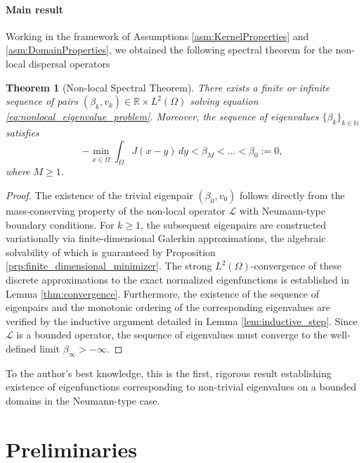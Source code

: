 \documentclass[11pt, a4paper]{article}
\theoremstyle{break}
\newtheorem{thm}{Theorem}[section]
\theoremstyle{break}
\theoremstyle{break}
\theoremstyle{break}
\theoremstyle{break}
\theoremstyle{break}
\theoremstyle{break}
\theoremstyle{break}
\theoremstyle{break}
\begin{document}
\paragraph{Main result}

Working in the framework of Assumptions \ref{asm:KernelProperties} and \ref{asm:DomainProperties}, we obtained the following spectral theorem for the non-local dispersal operators

\begin{thm}[Non-local Spectral Theorem]
\label{thm:spectral_theorem}
There exists a finite or infinite sequence of pairs $(\beta_k, v_k) \in \mathbb{R} \times L^2(\Omega)$ solving equation \eqref{eq:nonlocal_eigenvalue_problem}. Moreover, the sequence of eigenvalues $\{\beta_k\}_{k \in \mathbb{N}}$ satisfies
\begin{equation}
    -\min_{x \in \overline{\Omega}} \int_\Omega J(x-y) \, dy < \beta_M < \dots < \beta_0 := 0,
\end{equation}
where $M \geq 1$.
\end{thm}

\begin{proof}
The existence of the trivial eigenpair $(\beta_0, v_0)$ follows directly from the mass-conserving property of the non-local operator $\mathcal{L}$ with Neumann-type boundary conditions. For $k \ge 1$, the subsequent eigenpairs are constructed variationally via finite-dimensional Galerkin approximations, the algebraic solvability of which is guaranteed by Proposition \ref{prp:finite_dimensional_minimizer}. The strong $L^2(\Omega)$-convergence of these discrete approximations to the exact normalized eigenfunctions is established in Lemma \ref{thm:convergence}. Furthermore, the existence of the sequence of eigenpairs and the monotonic ordering of the corresponding eigenvalues are verified by the inductive argument detailed in Lemma \ref{lem:inductive_step}. Since $\mathcal{L}$ is a bounded operator, the sequence of eigenvalues must converge to the well-defined limit $\beta_\infty > -\infty$.
\end{proof}

To the author's best knowledge, this is the first, rigorous result establishing existence of eigenfunctions corresponding to non-trivial eigenvalues on a bounded domains in the Neumann-type case.

\section{Preliminaries}
\end{document}
